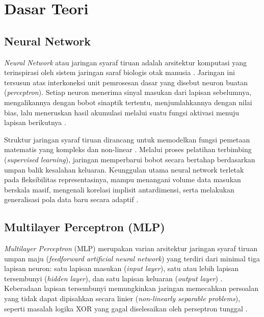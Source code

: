 \documentclass[a4paper,oneside,12pt]{report}
\begin{document}
\clearpage

\chapter[Dasar Teori]{Dasar Teori}

\section{Neural Network}
\textit{Neural Network} atau jaringan syaraf tiruan adalah arsitektur komputasi yang terinspirasi oleh sistem jaringan saraf biologis otak manusia \cite{ref_haykin}. Jaringan ini tersusun atas interkoneksi unit pemrosesan dasar yang disebut neuron buatan (\textit{perceptron}). Setiap neuron menerima sinyal masukan dari lapisan sebelumnya, mengalikannya dengan bobot sinaptik tertentu, menjumlahkannya dengan nilai bias, lalu meneruskan hasil akumulasi melalui suatu fungsi aktivasi menuju lapisan berikutnya \cite{ref_goodfellow}.

Struktur jaringan syaraf tiruan dirancang untuk memodelkan fungsi pemetaan matematis yang kompleks dan non-linear \cite{ref_hukubun}. Melalui proses pelatihan terbimbing (\textit{supervised learning}), jaringan memperbarui bobot secara bertahap berdasarkan umpan balik kesalahan keluaran. Keunggulan utama neural network terletak pada fleksibilitas representasinya, mampu menangani volume data masukan berskala masif, mengenali korelasi implisit antardimensi, serta melakukan generalisasi pola data baru secara adaptif \cite{ref_nielsen}.

\section{Multilayer Perceptron (MLP)}
\textit{Multilayer Perceptron} (MLP) merupakan varian arsitektur jaringan syaraf tiruan umpan maju (\textit{feedforward artificial neural network}) yang terdiri dari minimal tiga lapisan neuron: satu lapisan masukan (\textit{input layer}), satu atau lebih lapisan tersembunyi (\textit{hidden layer}), dan satu lapisan keluaran (\textit{output layer}) \cite{ref_pardede}. Keberadaan lapisan tersembunyi memungkinkan jaringan memecahkan persoalan yang tidak dapat dipisahkan secara linier (\textit{non-linearly separable problems}), seperti masalah logika XOR yang gagal diselesaikan oleh perseptron tunggal \cite{ref_haykin}.
\end{document}
